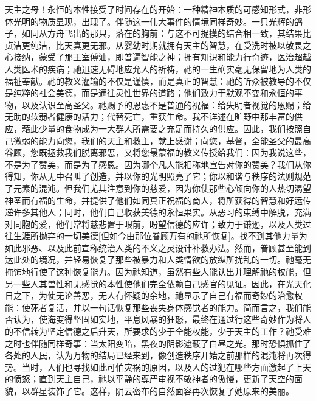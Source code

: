 天主之母！永恒的本性接受了时间存在的开始：一种精神本质的可感知形式，非形体光明的物质显现，出现了。伴随这一伟大事件的情境同样奇妙。一只光辉的鸽子，如同从方舟飞出的那只，落在的胸前：与这不可捉摸的结合相一致，其结果比贞洁更纯洁，比天真更无邪。从婴幼时期就拥有天主的智慧，在受洗时被以敬畏之心接纳，蒙受了那王室傅油，即普遍智能之神；拥有知识和能力行奇迹，医治超越人类医术的疾病；祂迅速无碍地应允人的祈祷，祂的一生确实毫无保留地为人类的福祉奉献。祂的教义灌输的不仅是谨慎，而是真正的智慧：祂的听众被教导的不仅是纯粹的社会美德，而是通往灵性世界的道路；他们致力于默观不变和永恒的事物，以及认识至高圣父。祂赐予的恩惠不是普通的祝福：给失明者视觉的恩赐；给无助的软弱者健康的活力；代替死亡，重获生命。我不详述在旷野中那丰富的供应，藉此少量的食物成为一大群人所需要之充足而持久的供应。因此，我们按照自己微弱的能力向您，我们的天主和救主，献上感谢；向您，基督，全能圣父的最高眷顾，您既拯救我们脱离邪恶，又将您最蒙福的教义传授给我们：因为我说这些，不是为了赞美，而是为了感恩。因为哪个凡人能相称地宣告对你的赞美？我们从你得知，你从无中召叫了创造，并以你的光明照亮了它；你以和谐与秩序的法则规范了元素的混沌。但我们尤其注意到你的慈爱，因为你使那些心倾向你的人热切渴望神圣而有福的生命，并提供了他们如同真正祝福的商人，将所获得的智慧和好运传递许多其他人；同时，他们自己收获美德的永恒果实。从恶习的束缚中解脱，充满对同胞的爱，他们常将慈悲置于眼前，盼望信德的应许；致力于谦逊，以及人类过往生涯所抛弃的一切美德[但如今由那位眷顾万有的祂所恢复]。找不到其他力量为如此邪恶、以及此前宣称统治人类的不义之灵设计补救办法。然而，眷顾甚至能到达此处的境况，并轻易恢复了那些被暴力和人类情欲的放纵所扰乱的一切。祂毫无掩饰地行使了这种恢复能力。因为祂知道，虽然有些人能认出并理解祂的权能，但另一些人其兽性和无感觉的本性使他们完全依赖自己感官的见证。因此，在光天化日之下，为使无论善恶，无人有怀疑的余地，祂显示了自己有福而奇妙的治愈权能：使死者复活，并以一句话恢复那些丧失身体感觉者的能力。简而言之，我们能否认为，使海变得坚固如实地，平息风暴的狂怒，最终在通过行这些奇妙作为将人的不信转为坚定信德之后升天，所要求的少于全能权能，少于天主的工作？祂受难之时也伴随同样奇事：当太阳变暗，黑夜的阴影遮蔽了白昼之光。那时恐惧抓住了各处的人民，认为万物的结局已经来到，像创造秩序开始之前那样的混沌将再次得势。当时，人们也寻找如此可怕灾祸的原因，以及人的过犯在哪些方面激起了上天的愤怒；直到天主自己，祂以平静的尊严审视不敬神者的傲慢，更新了天空的面貌，以群星装饰了它。这样，阴云密布的自然面容再次恢复了她原来的美丽。\par


